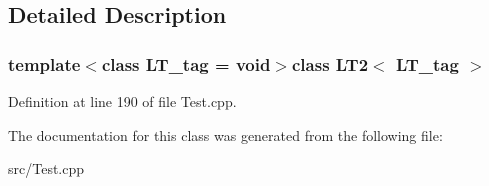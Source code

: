 \subsection{Detailed Description}
\subsubsection*{template$<$class L\+T\+\_\+tag = void$>$class L\+T2$<$ L\+T\+\_\+tag $>$}



Definition at line 190 of file Test.\+cpp.



The documentation for this class was generated from the following file\+:\begin{DoxyCompactItemize}
\item 
src/Test.\+cpp\end{DoxyCompactItemize}
